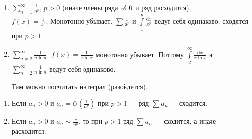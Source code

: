 \begin{example}
     \begin{enumerate}
         \item $\sum\limits_{n=1}^\infty \frac{1}{n^p}$, $p > 0$ (иначе члены ряда $\centernot \to 0$ и ряд расходится).\\
             $f(x) = \frac{1}{x^p}$. Монотонно убывает. $\sum \frac{1}{n^p}$ и $\int\limits_1^\infty \frac{\mathrm{d}x}{x^p}$ ведут себя одинаково: сходятся при  $p > 1$.
         \item $\sum\limits_{n=2}^\infty \frac{1}{n\ln n}$. $f(x) = \frac{1}{x\ln x}$ монотонно убывает. Поэтому $\int\limits_2^\infty \frac{\mathrm{d}x}{x\ln x}$ и $\sum\limits_{n=2}^\infty \frac{1}{n \ln n}$ ведут себя одинаково. 

             Там можно посчитать интеграл (разойдется).
    \end{enumerate}
\end{example}
\begin{consequence}
    \begin{enumerate}
        \item Если $a_n > 0$ и  $a_n = \mathcal{O}(\frac{1}{n^p})$ при $p > 1$ --- ряд  $\sum a_n$ --- сходится.
        \item Если  $a_n > 0$ и  $a_n \sim \frac{c}{n^p}$, то при $p > 1$ ряд  $\sum a_n$ --- сходится, а иначе расходится.
    \end{enumerate}
\end{consequence}
